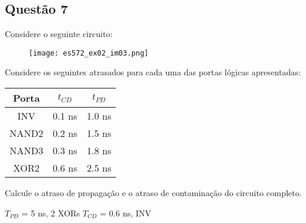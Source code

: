 \documentclass{article}
\begin{document}
        \subsection{Questão 7}
            \begin{exercise}
                Considere o seguinte circuito:
                    \begin{figure}[H]
                        \centering
                        \texttt{[image: es572\_ex02\_im03.png]}
                    \end{figure} \noindent
                Considere os seguintes atrasados para cada uma das portas lógicas apresentadas:
                    \begin{table}[H]
                        \centering  
                        \begin{tabular}[]{c|cc}\hline
                            Porta & $t_{CD}$ & $t_{PD}$\\\hline
                            INV   & 0.1 ns   & 1.0 ns\\
                            NAND2 & 0.2 ns   & 1.5 ns\\
                            NAND3 & 0.3 ns   & 1.8 ns\\
                            XOR2  & 0.6 ns   & 2.5 ns\\\hline
                        \end{tabular}
                    \end{table}
                Calcule o atraso de propagação e o atraso de contaminação do circuito completo.
            \end{exercise}
            \begin{resolution}
                $T_{PD}$ = 5 ns, 2 XORs
                $T_{CD}$ = 0.6 ns, INV
            \end{resolution}
\end{document}
